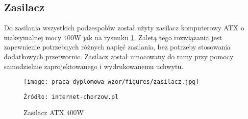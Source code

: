 \subsection{Zasilacz}
Do zasilania wszystkich podzespołów został użyty zasilacz komputerowy ATX o maksymalnej mocy 400W jak na rysunku \ref{fig:zasilacz}. Zaletą tego rozwiązania jest zapewnienie potrzebnych różnych napięć zasilania, bez potrzeby stosowania dodatkowych przetwornic. Zasilacz został umocowany do ramy przy pomocy samodzielnie zaprojektowanego i wydrukowanemu uchwytu.

\begin{figure}
    \centering
    \texttt{[image: praca\_dyplomowa\_wzor/figures/zasilacz.jpg]}
    \caption{Zasilacz ATX 400W}
    \texttt{Źródło: internet-chorzow.pl}
    \label{fig:zasilacz}
\end{figure}



